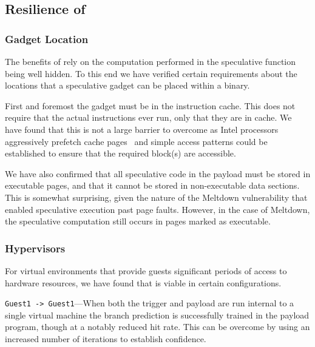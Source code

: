 \subsection{Resilience of \speculake}
%

\subsubsection{Gadget Location}
The benefits of \speculake rely on the computation performed in the
speculative function being well hidden. To this end we have verified 
certain requirements about the locations that a speculative gadget can 
be placed within a binary. 

First and foremost the gadget must be in the instruction cache. 
This does not require that the actual instructions ever run,
 only that they are in cache. We have 
found that this is not a large barrier to overcome as Intel 
processors aggressively prefetch cache pages~\cite{measuring-cache}
and simple access patterns could be established to ensure
that the required block(s) are accessible. 

We have also confirmed that all speculative code in the payload must be
stored in executable pages, and that it cannot be stored in non-executable data
sections. This is somewhat surprising, given the nature of the Meltdown
vulnerability that enabled speculative execution past page faults. However, in
the case of Meltdown, the speculative computation still occurs in pages marked
as executable.



\subsubsection{Hypervisors}
For virtual environments that provide guests significant periods of access to 
hardware resources, we have found that \speculake is viable in certain configurations. 

\texttt{Guest1 -> Guest1}---When both the trigger and payload are run internal to a
single virtual machine the branch prediction is successfully trained in the
payload program, though at a notably reduced hit rate. This can be overcome by
using an increased number of iterations to establish confidence. 

